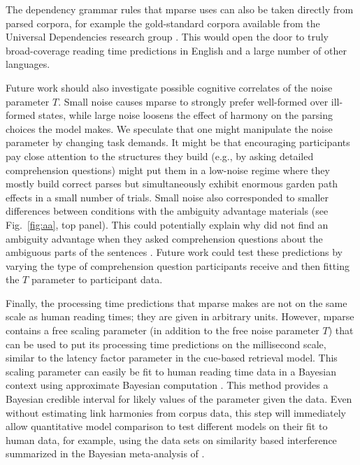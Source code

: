 \documentclass[a4paper, 12pt]{article}
\begin{document}
The dependency grammar rules that mparse uses can also be taken directly from
parsed corpora, for example the gold-standard corpora available from the
Universal Dependencies research group \citep{nivre2016universal}. This would
open the door to truly broad-coverage reading time predictions \citep[testing
against self-paced reading times in the Natural Stories Corpus,][for
example]{futrell2020natural} in English and a large number of other languages.

Future work should also investigate possible cognitive correlates of the noise
parameter $T$. Small noise causes mparse to strongly prefer well-formed over
ill-formed states, while large noise loosens the effect of harmony on the
parsing choices the model makes. We speculate that one might manipulate the
noise parameter by changing task demands. It might be that encouraging
participants pay close attention to the structures they build (e.g., by asking
detailed comprehension questions) might put them in a low-noise regime where
they mostly build correct parses but simultaneously exhibit enormous garden
path effects in a small number of trials. Small noise also corresponded to
smaller differences between conditions with the ambiguity advantage materials
(see Fig.~\ref{fig:aa}, top panel). This could potentially explain why
\citet{swets2008underspecification} did not find an ambiguity advantage when
they asked comprehension questions about the ambiguous parts of the sentences
\citep[see also][]{logacev2015multiple}. Future work could test these
predictions by varying the type of comprehension question participants receive
and then fitting the $T$ parameter to participant data.

Finally, the processing time predictions that mparse makes are not on the same
scale as human reading times; they are given in arbitrary units. However,
mparse contains a free scaling parameter (in addition to the free noise
parameter $T$) that can be used to put its processing time predictions on the
millisecond scale, similar to the latency factor parameter in the cue-based
retrieval model. This scaling parameter can easily be fit to human reading time
data in a Bayesian context using approximate Bayesian computation
\citep{sisson2019handbook, palestro2018likelihood}. This method provides a
Bayesian credible interval for likely values of the parameter given the data.
Even without estimating link harmonies from corpus data, this step will
immediately allow quantitative model comparison to test different models on
their fit to human data, for example, using the data sets on similarity based
interference summarized in the Bayesian meta-analysis of
\citet{jaeger2017similarity}.
\end{document}
